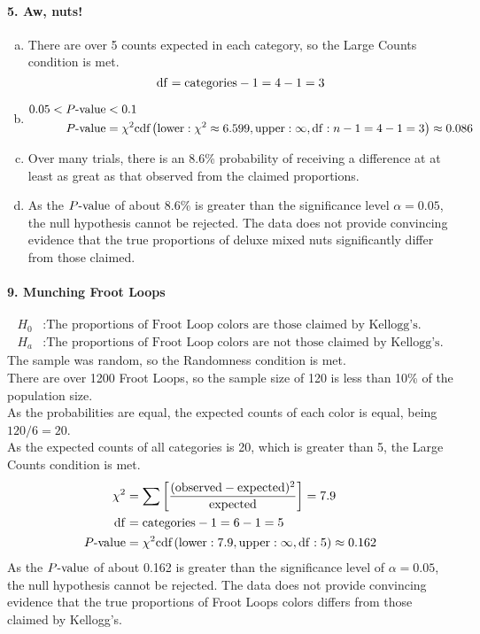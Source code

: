 \documentclass[../Homework]{subfiles}
\begin{document}
		\paragraph{5. Aw, nuts!}
			\begin{enumerate}[a.]
				\item
					There are over 5 counts expected in each category, so the Large Counts condition is met.
					\[\operatorname{df} = \text{categories} - 1 = 4 - 1 = 3\]
				\item
					\begin{align*}
						0.05 < P\text{-value} &< 0.1 \\
						P\text{-value} &= \chi^2\text{cdf}\left(\operatorname{lower}: \chi^2 \approx 6.599, \operatorname{upper}: \infty, \operatorname{df}: n - 1 = 4 - 1 = 3\right) \approx 0.086
					\end{align*}
				\item
					Over many trials, there is an 8.6\% probability of receiving a difference at at least as great as that observed from the claimed proportions.
				\item
					As the $P\text{-value}$ of about 8.6\% is greater than the significance level $\alpha = 0.05$, the null hypothesis cannot be rejected. The data does not provide convincing evidence that the true proportions of deluxe mixed nuts significantly differ from those claimed.
			\end{enumerate}
		\paragraph{9. Munching Froot Loops}
			\begin{align*}
				H_0&: \text{The proportions of Froot Loop colors are those claimed by Kellogg's.} \\
				H_a&: \text{The proportions of Froot Loop colors are not those claimed by Kellogg's.}
			\end{align*}
			The sample was random, so the Randomness condition is met. \\
			There are over 1200 Froot Loops, so the sample size of 120 is less than 10\% of the population size. \\
			As the probabilities are equal, the expected counts of each color is equal, being $120/6 = 20$. \\
			As the expected counts of all categories is 20, which is greater than 5, the Large Counts condition is met. \\
			\begin{align*}
				\chi^2 &= \sum\left[\mathrm{\frac{(observed - expected)^2}{expected}}\right] = 7.9 \\
				\operatorname{df} &= \text{categories} - 1 = 6 - 1 = 5 \\
				P\text{-value} &= \chi^2\text{cdf}\left(\operatorname{lower}: 7.9, \operatorname{upper}: \infty, \operatorname{df}: 5\right) \approx 0.162
			\end{align*}
			As the $P\text{-value}$ of about 0.162 is greater than the significance level of $\alpha = 0.05$, the null hypothesis cannot be rejected. The data does not provide convincing evidence that the true proportions of Froot Loops colors differs from those claimed by Kellogg's.
\end{document}
